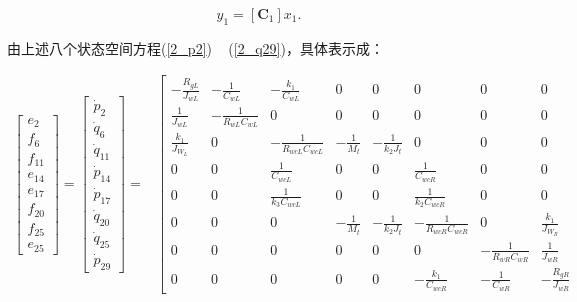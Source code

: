 \begin{equation}\label{2_y1}
y_1 =[\mathbf{C}_1] x_1.
\end{equation}

由上述八个状态空间方程(\ref{2_p2}) ~ (\ref{2_q29})，具体表示成：

\begin{equation}\label{2_matrix1}
\begin{aligned}
\left[ 
\begin{array}
{l}{e_{2}} \\ {f_{6}} \\ {f_{11}} \\ {e_{14}} \\ {e_{17}} \\ {f_{20}} \\ {f_{25}} \\ {e_{25}}
\end{array}
\right] 
=
\left[ 
\begin{array}
{c}{\dot{p}_{2}} \\ {\dot{q}_{6}} \\ {\dot{q}_{11}} \\ {\dot{p}_{14}} \\ {\dot{p}_{17}} \\ {\dot{q}_{20}} \\ {\dot{q}_{25}} \\ {\dot{p}_{29}}
\end{array}
\right]
=
&
\left[ 
\begin{array}{cccccccc}
{- \frac{R_{gL}}{J_{w L}}} & - \frac{1}{C_{wL}} & - \frac{k_1}{C_{w L}} & 0 & 0 & 0 & 0 & 0 \\ 
\frac{1}{J_{w L}} & - \frac{1}{R_{wL} C_{wL}} & 0 & 0 & 0 & 0 & 0 & 0 \\ 
\frac{k_{1}}{J_{W_L}}  & 0 & - \frac{1}{R_{wc L} C_{wc L}} & - \frac{1}{M_{t}} & - \frac{1}{k_{2} J_{t}} & 0 & 0 & 0  \\ 
0 & 0 & \frac{1}{C_{wc L}} & 0 & 0 & \frac{1}{C_{wc R}}  & 0 & 0   \\ 
0 & 0 & \frac{1}{k_{3} C_{wc L}} & 0 & 0 & \frac{1}{k_{2} C_{wc R}}  & 0 & 0  \\ 
0 & 0 & 0 & - \frac{1}{M_{t}} & - \frac{1}{k_{2} J_{t}} & - \frac{1}{R_{wc R} C_{wc R}} & 0 & \frac{k_{1}}{J_{W_R}} \\ 
0 & 0 & 0 & 0 & 0 & 0 & - \frac{1}{R_{w R}  C_{w R}} & \frac{1}{J_{w R}}  \\ 
0 & 0 & 0 & 0 & 0 & - \frac{k_{1}}{C_{wc R}} & - \frac{1}{C_{w R}} &  - \frac{R_{g R}}{J_{wR}} 
\end{array}

\end{aligned}
\end{equation}
